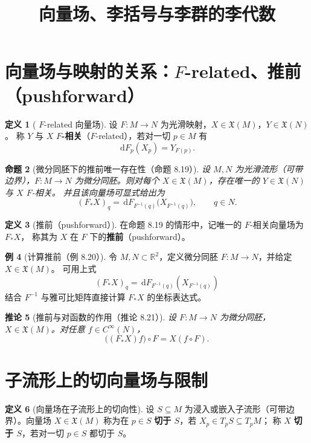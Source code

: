 \documentclass[11pt,a4paper]{article}
\title{向量场、李括号与李群的李代数}
\author{}
\date{}
\newcommand{\R}{\mathbb{R}}
\newcommand{\X}{\mathfrak{X}} %
\newcommand{\dd}{\,\mathrm{d}}
\theoremstyle{definition}
\newtheorem{definition}{定义}[section]
\newtheorem{example}[definition]{例}
\theoremstyle{plain}
\newtheorem{proposition}[definition]{命题}
\newtheorem{corollary}[definition]{推论}
\begin{document}
\maketitle

\tableofcontents

\section{向量场与映射的关系：$F$-related、推前（pushforward）}

\begin{definition}[ $F$-related 向量场]
设 $F:M\to N$ 为光滑映射，$X\in\X(M)$，$Y\in\X(N)$。
称 $Y$ 与 $X$ \textbf{$F$-相关}（$F$-related），若对一切 $p\in M$ 有
\[
\dd F_p(X_p)=Y_{F(p)}.
\]
\end{definition}

\begin{proposition}[微分同胚下的推前唯一存在性（命题 8.19）]
设 $M,N$ 为光滑流形（可带边界），$F:M\to N$ 为微分同胚。则对每个 $X\in\X(M)$，存在唯一的 $Y\in\X(N)$ 与 $X$ $F$-相关。
并且该向量场可显式给出为
\[
(F_*X)_q=\dd F_{F^{-1}(q)}\bigl(X_{F^{-1}(q)}\bigr),\qquad q\in N.
\]
\end{proposition}

\begin{definition}[推前（pushforward）]
在命题 8.19 的情形中，记唯一的 $F$-相关向量场为 $F_*X$，
称其为 $X$ 在 $F$ 下的\textbf{推前}（pushforward）。
\end{definition}

\begin{example}[计算推前（例 8.20）]
令 $M,N\subset \R^2$，定义微分同胚 $F:M\to N$，并给定 $X\in\X(M)$。
可用上式
\[
(F_*X)_q=\dd F_{F^{-1}(q)}(X_{F^{-1}(q)})
\]
结合 $F^{-1}$ 与雅可比矩阵直接计算 $F_*X$ 的坐标表达式。
\end{example}

\begin{corollary}[推前与对函数的作用（推论 8.21）]
设 $F:M\to N$ 为微分同胚，$X\in\X(M)$。对任意 $f\in C^\infty(N)$，
\[
\bigl((F_*X)f\bigr)\circ F = X(f\circ F).
\]
\end{corollary}

\section{子流形上的切向量场与限制}

\begin{definition}[向量场在子流形上的切向性]
设 $S\subseteq M$ 为浸入或嵌入子流形（可带边界）。向量场 $X\in\X(M)$
称为在 $p\in S$ \textbf{切于 $S$}，若 $X_p\in T_pS\subseteq T_pM$；
称 $X$ \textbf{切于 $S$}，若对一切 $p\in S$ 都切于 $S$。
\end{definition}
\end{document}
